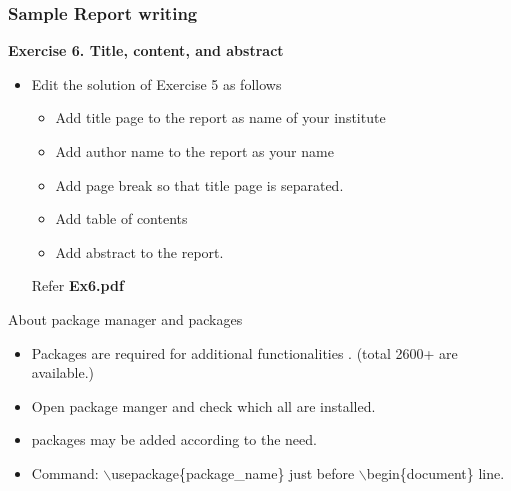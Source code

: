 \documentclass [9pt] {beamer}
\begin{document}
\begin{frame}\frametitle{Sample Report writing}
\rm
\fontsize{9pt}{11pt}\selectfont

\textbf{Exercise 6. Title, content, and abstract}\\[.30cm]
\begin{itemize}
	\item Edit the solution of Exercise 5 as follows \\[.30cm]
	\begin{itemize}
		\item Add title page to the report as  name of your institute \\[.30cm]
		
		\item Add author name to the report as your name \\[.30cm]
		
		\item Add page break so that title page is separated. \\[.30cm]
		
		\item Add table of contents  \\[0.30cm]
		
		\item Add abstract to the report.\\[0.30cm]
	\end{itemize}
\tiny Refer \textbf{Ex6.pdf}	
\end{itemize}
\end{frame}



\begin{frame}{About package manager and packages}
\begin{itemize}
	\item Packages are required for additional functionalities . (total 2600+ are available.)\\[0.4cm]
	\item Open package manger and check which all are installed. \\[0.4cm]
	
	\item packages may be added according to the need. \\[0.4cm]
	
	\item Command: \textcolor[rgb]{0.98,0.00,0.00}{$\backslash$usepackage\{package\_name\}}
	just before $\backslash$begin\{document\} line.
	
	
\end{itemize}
\end{frame}
\end{document}
